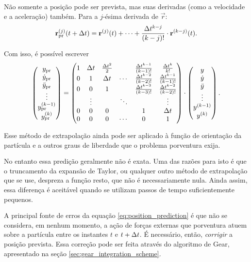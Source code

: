 Não somente a posição pode ser prevista, mas suas derivadas (como a velocidade e a aceleração) também. Para a \(j\)-ésima derivada de \(\vec{r}\):
\[
	\predicted{\deriv{j}{\vec{r}}}\pqty{t + \Dt} = \deriv{j}{\vec{r}}\pqty{t} + \dots + \dfrac{\Dt^{k-j}}{\pqty{k-j}!}\cdot\deriv{k-j}{\vec{r}}\pqty{t}.
\]

Com isso, é possível escrever
\[
\begin{pmatrix}
	\predicted{y} \\
	\predicted{\deriv{1}{y}} \\
	\predicted{\deriv{2}{y}} \\
	\vdots \\
	\predicted{\deriv{k-1}{y}} \\
	\predicted{\deriv{k}{y}}
\end{pmatrix}
=
\begin{pmatrix}
	1 & \Dt & \frac{\Dt^2}{2} &  & \frac{\Dt^{k-1}}{\pqty{k-1}!} & \frac{\Dt^k}{k!} \\
	0 & 1 & \Dt & \cdots & \frac{\Dt^{k-2}}{\pqty{k-2}!} & \frac{\Dt^{k-1}}{\pqty{k-1}!} \\
	0 & 0 & 1 &  & \frac{\Dt^{k-3}}{\pqty{k-3}!} & \frac{\Dt^{k-2}}{\pqty{k-2}!} \\
     & \vdots & & \ddots & & \vdots \\
    0 & 0 & 0 &  & 1 & \Dt \\
    0 & 0 & 0 & \cdots & 0 & 1
\end{pmatrix}
\cdot
\begin{pmatrix}
	y \\
	\deriv{1}{y} \\
	\deriv{2}{y} \\
	\vdots \\
	\deriv{k-1}{y} \\
	\deriv{k}{y}
\end{pmatrix}.
\]

Esse método de extrapolação ainda pode ser aplicado à função de orientação da partícula e a outros graus de liberdade que o problema porventura exija.

No entanto essa predição geralmente não é exata. Uma das razões para isto é que o truncamento da expansão de Taylor, ou qualquer outro método de extrapolação que se use, despreza a função resto, que não é necessariamente nula. Ainda assim, essa diferença é aceitável quando se utilizam passos de tempo suficientemente pequenos. 

A principal fonte de erros da equação \eqref{eq:position_prediction} é que não se considera, em nenhum momento, a ação de forças externas que porventura atuem sobre a partícula entre os instantes \(t\) e \(t + \Delta t\). É necessário, então, \textit{corrigir} a posição prevista. Essa correção pode ser feita através do algoritmo de Gear, apresentado na seção \ref{sec:gear_integration_scheme}.

